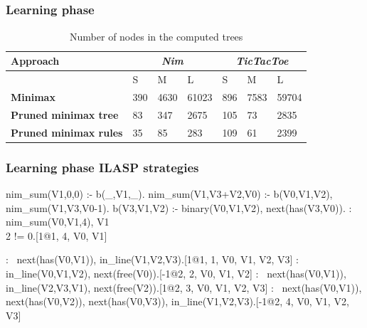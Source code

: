 \documentclass{beamer}
\begin{document}
\subsection{}
\begin{framefont}{\footnotesize}
  \begin{frame}
    \frametitle{Learning phase}
\begin{table}[]
    \begin{tabular}{*7l}
    \toprule
\textbf{Approach} &  \multicolumn{3}{c}{\textit{Nim}} & \multicolumn{3}{c}{\textit{TicTacToe}}\\
  \midrule
  
  {} & S  & M & L & S  & M & L
  \\
  \midrule[0.35mm]
  \textbf{Minimax}  & 390 & 4630 & 61023
  & 896 & 7583 & 59704
  \\[20pt]
  \textbf{Pruned minimax tree}   & 83 & 347 & 2675 & 105 & 73 & 2835
  \\[20pt]
  \textbf{Pruned minimax rules} & 35 & 85 & 283 & 109 & 61 & 2399 
  \\
\bottomrule
\end{tabular}
\caption{Number of nodes in the computed trees}

\end{table}
    
  \end{frame}
\end{framefont}


\begin{frame}[fragile]
  \footnotesize
  \frametitle{Learning phase ILASP strategies}


  \begin{example}
    \begin{semiverbatim}
nim\_sum(V1,0,0) :- b(\_,V1,\_).
nim\_sum(V1,V3+V2,V0) :- b(V0,V1,V2), nim\_sum(V1,V3,V0-1).
b(V3,V1,V2) :- binary(V0,V1,V2), next(has(V3,V0)).
:~ nim\_sum(V0,V1,4), V1\\2 != 0.[1@1, 4, V0, V1]
  \end{semiverbatim}
  \end{example}
  \pause
  \begin{example}
    \begin{semiverbatim}
:~ next(has(V0,V1)), in_line(V1,V2,V3).[1@1, 1, V0, V1, V2, V3]
:~ in_line(V0,V1,V2), next(free(V0)).[-1@2, 2, V0, V1, V2]
:~ next(has(V0,V1)), in_line(V2,V3,V1), 
    next(free(V2)).[1@2, 3, V0, V1, V2, V3]
:~ next(has(V0,V1)), next(has(V0,V2)), 
    next(has(V0,V3)), in_line(V1,V2,V3).[-1@2, 4, V0, V1, V2, V3]
  \end{semiverbatim}
  \end{example}

\end{frame}
\end{document}
